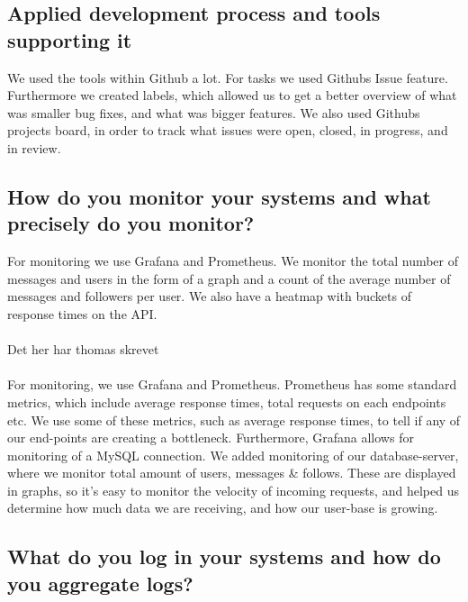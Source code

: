 \documentclass{article}
\begin{document}
\subsection{Applied development process and tools supporting it}
We used the tools within Github a lot. For tasks we used Githubs Issue feature. Furthermore we created labels, which allowed us to get a better overview of what was smaller bug fixes, and what was bigger features. We also used Githubs projects board, in order to track what issues were open, closed, in progress, and in review.

\subsection{How do you monitor your systems and what precisely do you monitor?}
For monitoring we use Grafana and Prometheus. We monitor the total number of messages and users in the form of a graph and a count of the average number of messages and followers per user. We also have a heatmap with buckets of response times on the API.\\\\

Det her har thomas skrevet \\\\
For monitoring, we use Grafana and Prometheus. Prometheus has some standard metrics, which include average response times, total requests on each endpoints etc. We use some of these metrics, such as average response times, to tell if any of our end-points are creating a bottleneck. Furthermore, Grafana allows for monitoring of a MySQL connection. We added monitoring of our database-server, where we monitor total amount of users, messages & follows. These are displayed in graphs, so it's easy to monitor the velocity of incoming requests, and helped us determine how much data we are receiving, and how our user-base is growing.

\subsection{What do you log in your systems and how do you aggregate logs?}
\end{document}
